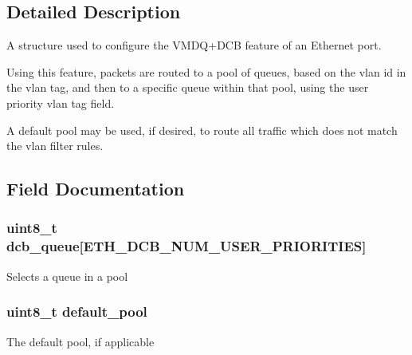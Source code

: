 \subsection{Detailed Description}
A structure used to configure the V\+M\+D\+Q+\+D\+C\+B feature of an Ethernet port.

Using this feature, packets are routed to a pool of queues, based on the vlan id in the vlan tag, and then to a specific queue within that pool, using the user priority vlan tag field.

A default pool may be used, if desired, to route all traffic which does not match the vlan filter rules. 

\subsection{Field Documentation}
\hypertarget{structrte__eth__vmdq__dcb__conf_a408b6ddd20adea68e86b4a90b4780264}{}
\subsubsection[{dcb\+\_\+queue}]{\setlength{\rightskip}{0pt plus 5cm}uint8\+\_\+t dcb\+\_\+queue\mbox{[}{\bf E\+T\+H\+\_\+\+D\+C\+B\+\_\+\+N\+U\+M\+\_\+\+U\+S\+E\+R\+\_\+\+P\+R\+I\+O\+R\+I\+T\+I\+E\+S}\mbox{]}}\label{structrte__eth__vmdq__dcb__conf_a408b6ddd20adea68e86b4a90b4780264}
Selects a queue in a pool \hypertarget{structrte__eth__vmdq__dcb__conf_a6024467b1697aea1e1c8eb5fd93b0808}{}
\subsubsection[{default\+\_\+pool}]{\setlength{\rightskip}{0pt plus 5cm}uint8\+\_\+t default\+\_\+pool}\label{structrte__eth__vmdq__dcb__conf_a6024467b1697aea1e1c8eb5fd93b0808}
The default pool, if applicable \hypertarget{structrte__eth__vmdq__dcb__conf_ac97924c8c390cedbe8533423062ca347}{}
